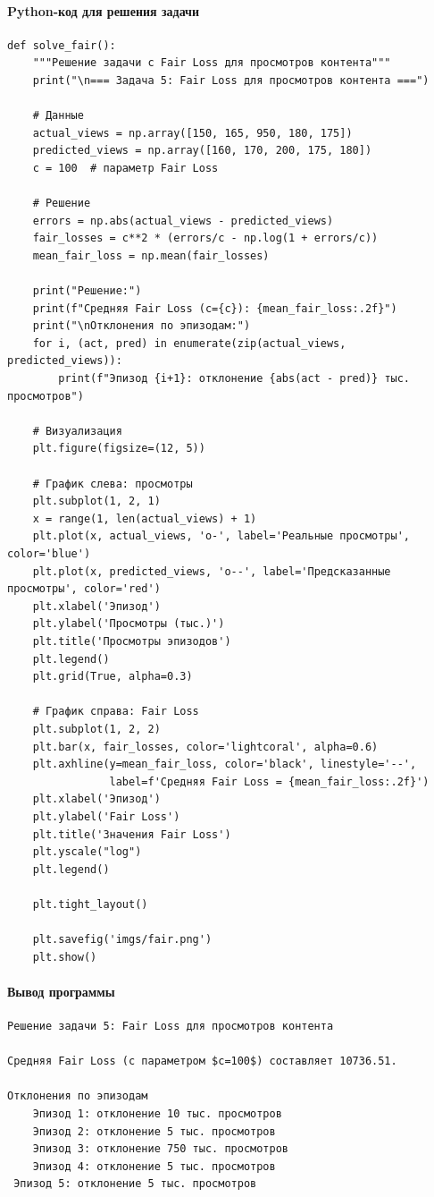 \paragraph*{Python-код для решения задачи}
\begin{verbatim}
def solve_fair():
    """Решение задачи с Fair Loss для просмотров контента"""
    print("\n=== Задача 5: Fair Loss для просмотров контента ===")
    
    # Данные
    actual_views = np.array([150, 165, 950, 180, 175])
    predicted_views = np.array([160, 170, 200, 175, 180])
    c = 100  # параметр Fair Loss
    
    # Решение
    errors = np.abs(actual_views - predicted_views)
    fair_losses = c**2 * (errors/c - np.log(1 + errors/c))
    mean_fair_loss = np.mean(fair_losses)
    
    print("Решение:")
    print(f"Средняя Fair Loss (c={c}): {mean_fair_loss:.2f}")
    print("\nОтклонения по эпизодам:")
    for i, (act, pred) in enumerate(zip(actual_views, predicted_views)):
        print(f"Эпизод {i+1}: отклонение {abs(act - pred)} тыс. просмотров")
    
    # Визуализация
    plt.figure(figsize=(12, 5))
    
    # График слева: просмотры
    plt.subplot(1, 2, 1)
    x = range(1, len(actual_views) + 1)
    plt.plot(x, actual_views, 'o-', label='Реальные просмотры', color='blue')
    plt.plot(x, predicted_views, 'o--', label='Предсказанные просмотры', color='red')
    plt.xlabel('Эпизод')
    plt.ylabel('Просмотры (тыс.)')
    plt.title('Просмотры эпизодов')
    plt.legend()
    plt.grid(True, alpha=0.3)
    
    # График справа: Fair Loss
    plt.subplot(1, 2, 2)
    plt.bar(x, fair_losses, color='lightcoral', alpha=0.6)
    plt.axhline(y=mean_fair_loss, color='black', linestyle='--', 
                label=f'Средняя Fair Loss = {mean_fair_loss:.2f}')
    plt.xlabel('Эпизод')
    plt.ylabel('Fair Loss')
    plt.title('Значения Fair Loss')
    plt.yscale("log")
    plt.legend()
    
    plt.tight_layout()
    
    plt.savefig('imgs/fair.png')
    plt.show()
\end{verbatim}
\paragraph{Вывод программы}
\begin{verbatim}
Решение задачи 5: Fair Loss для просмотров контента

Средняя Fair Loss (с параметром $c=100$) составляет 10736.51.

Отклонения по эпизодам
    Эпизод 1: отклонение 10 тыс. просмотров
    Эпизод 2: отклонение 5 тыс. просмотров
    Эпизод 3: отклонение 750 тыс. просмотров
    Эпизод 4: отклонение 5 тыс. просмотров
 Эпизод 5: отклонение 5 тыс. просмотров
\end{verbatim}

